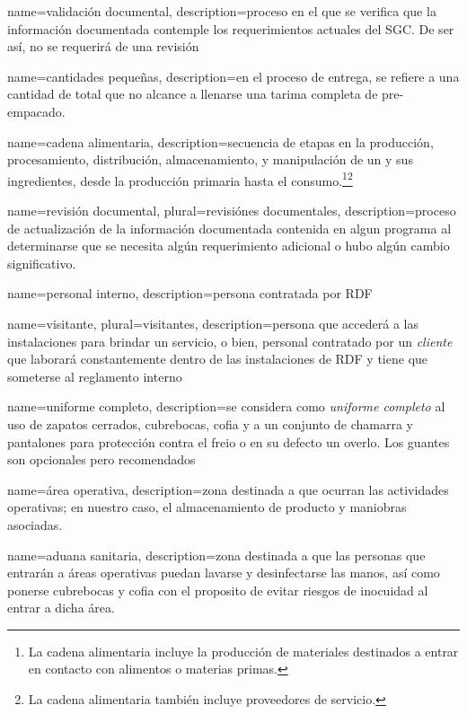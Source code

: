 {
    name=validación documental,
    description={proceso en el que se verifica que la información documentada contemple los requerimientos actuales del SGC. De ser así, no se requerirá de una revisión}
}


{
    name=cantidades pequeñas,
    description={en el proceso de entrega, se refiere a una cantidad de  total que no alcance a llenarse una tarima completa de  pre-empacado.}
}

{
    name=cadena alimentaria,
    description={secuencia de etapas en la producción, procesamiento, distribución, almacenamiento, y manipulación de un  y sus ingredientes, desde la producción primaria hasta el consumo.\footnote{La cadena alimentaria incluye la producción de materiales destinados a entrar en contacto con alimentos o materias primas.}\footnote{La cadena alimentaria también incluye proveedores de servicio.}}
}


{
    name=revisión documental,
    plural=revisiónes documentales,
    description={proceso de actualización de la información documentada contenida en algun programa al determinarse que se necesita algún requerimiento adicional o hubo algún cambio significativo.}
}

{
    name=personal interno,
    description={persona contratada por RDF}
}

{
    name=visitante,
    plural=visitantes,
    description={persona que accederá a las instalaciones para brindar un servicio, o bien, personal contratado por un \emph{cliente} que laborará constantemente dentro de las instalaciones de RDF y tiene que someterse al reglamento interno}
}

{
    name=uniforme completo,
    description={se considera como \textit{uniforme completo} al uso de zapatos cerrados, cubrebocas, cofia y a un conjunto de chamarra y pantalones para protección contra el freio o en su defecto un overlo. Los guantes son opcionales pero recomendados}
}

{
    name=área operativa,
    description={zona destinada a que ocurran las actividades operativas; en nuestro caso, el almacenamiento de producto y maniobras asociadas.}
}

{
    name=aduana sanitaria,
    description={zona destinada a que las personas que entrarán a áreas operativas puedan lavarse y desinfectarse las manos, así como ponerse cubrebocas y cofia con el proposito de evitar riesgos de inocuidad al entrar a dicha área.}
}

